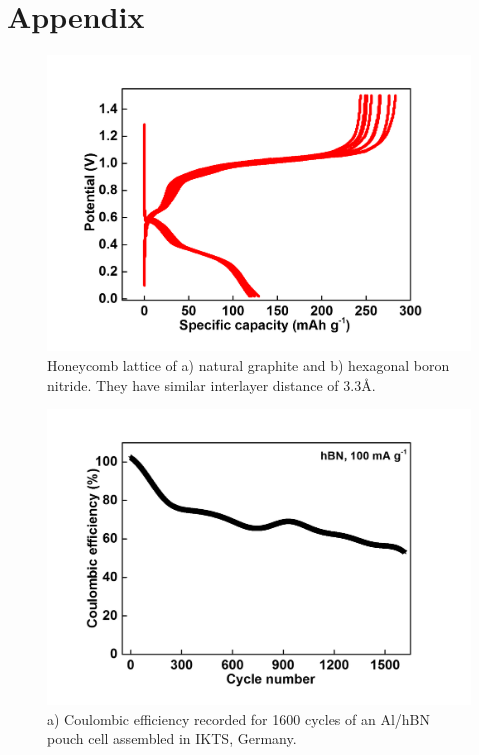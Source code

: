 \chapter{Appendix} %
\label{appA} %
\begin{figure}[tbh!]
\centering
\includegraphics[width=\textwidth]{Figures/appendix/hBNrepeat}
\caption{Honeycomb lattice of a) natural graphite and b) hexagonal boron nitride. They have similar interlayer distance of 3.3\AA.}
\label{Figures/appendix:hBNrepeat}
\end{figure}
\begin{figure}[tbh!]
\centering
\includegraphics[width=\textwidth]{Figures/appendix/pouchCE}
\caption{a) Coulombic efficiency recorded for 1600 cycles of an Al/hBN pouch cell assembled in IKTS, Germany.}
\label{Figures/appendix:pouchCE}
\end{figure}
